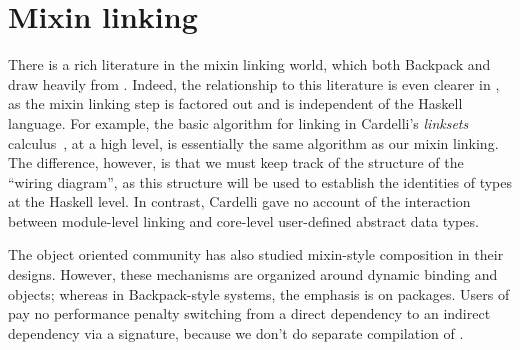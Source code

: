 \section{Mixin linking}

There is a rich literature in the mixin
linking world, which both Backpack and \Backpack{} draw heavily from
\cite{ancona+:cms,flatt+:units,rossberg+:mixml}.  Indeed,
the relationship to this literature is even clearer in \Backpack{}, as
the mixin linking step is factored out and is independent of the
Haskell language.  For example, the basic algorithm for linking in
Cardelli's \emph{linksets} calculus~\cite{cardelli:linksets}, at a
high level, is essentially the same algorithm as our mixin linking.
The difference, however, is that we must keep track of the structure
of the ``wiring diagram'', as this structure will be used to establish
the identities of types at the Haskell level.  In contrast, Cardelli
gave no account of the interaction between module-level linking and
core-level user-defined abstract data types.

The object oriented community has also studied mixin-style composition
in their designs.  However, these mechanisms are organized around
dynamic binding and objects; whereas in Backpack-style systems,
the emphasis is on packages.  Users of \Backpack{} pay no performance
penalty switching from a direct dependency to an indirect dependency
via a signature, because we don't do separate compilation of \Backpack{}.









